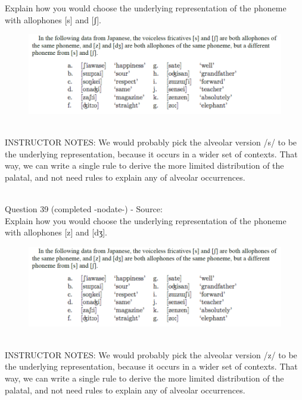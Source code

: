 \documentclass[12pt]{article}
\begin{document}
Explain how you would choose the underlying representation of the phoneme with allophones [s] and [ʃ].\\

\begin{figure}[H]
\includegraphics{../images/japanese.png}
\end{figure}

~\\
INSTRUCTOR NOTES: We would probably pick the alveolar version /s/ to be the underlying representation, because it occurs in a wider set of contexts. That way, we can write a single rule to derive the more limited distribution of the palatal, and not need rules to explain any of alveolar occurrences.


~\\

{\large Question 39} (completed -nodate-) - Source: \\

Explain how you would choose the underlying representation of the phoneme with allophones [z] and [dʒ].\\

\begin{figure}[H]
\includegraphics{../images/japanese.png}
\end{figure}

~\\
INSTRUCTOR NOTES: We would probably pick the alveolar version /z/ to be the underlying representation, because it occurs in a wider set of contexts. That way, we can write a single rule to derive the more limited distribution of the palatal, and not need rules to explain any of alveolar occurrences.
\end{document}
